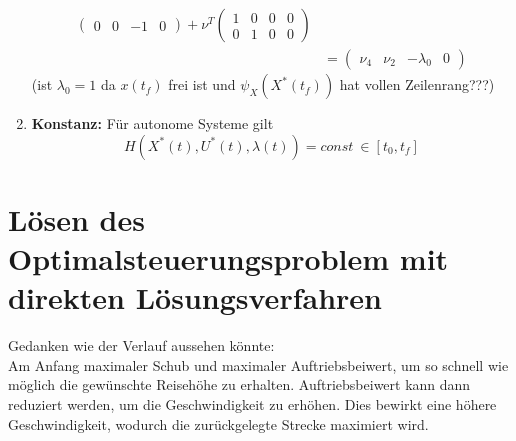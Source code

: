 \begin{enumerate}
\[\begin{split}
\begin{pmatrix}
0 & 0 & -1 & 0
\end{pmatrix}  + \nu^T \begin{pmatrix}
1 & 0 & 0 & 0 \\
0 & 1 & 0 & 0 
\end{pmatrix}  \\\
&= \begin{pmatrix}
\nu_4 & \nu_2 & -\lambda_0 & 0 
\end{pmatrix}
\end{split}\]
(ist $\lambda_{0} =1$ da $x(t_f)$ frei ist und $\psi_X(X^{\ast}(t_f))$ hat vollen Zeilenrang???) 
%
\item \textbf{Konstanz:} Für autonome Systeme gilt \[H(X^{\ast}(t),U^{\ast}(t), \lambda(t)) = const \ \in [t_0,t_f]\]
\end{enumerate}





\newpage
\section{Lösen des Optimalsteuerungsproblem mit direkten Lösungsverfahren}


Gedanken wie der Verlauf aussehen könnte:\\
Am Anfang maximaler Schub und maximaler Auftriebsbeiwert, um so schnell wie möglich die gewünschte Reisehöhe zu erhalten. Auftriebsbeiwert kann dann reduziert werden, um die Geschwindigkeit zu erhöhen. Dies bewirkt eine höhere Geschwindigkeit, wodurch die zurückgelegte Strecke maximiert wird.










































